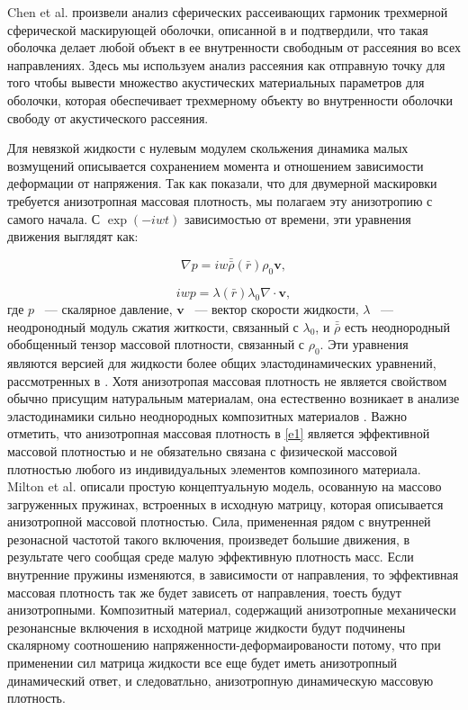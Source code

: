 \documentclass[a4paper, 12pt]{article}
\newcommand{\dbar}[1]{\bar{\bar{#1}}}
\begin{document}
Chen et al. \cite{7} произвели анализ сферических рассеивающих гармоник 
трехмерной сферической маскирующей оболочки, описанной в \cite{1}  
и подтвердили, что такая оболочка делает любой объект в ее внутренности свободным 
от рассеяния во всех направлениях. Здесь мы используем анализ рассеяния как 
отправную точку для того чтобы вывести множество акустических материальных 
параметров для оболочки, которая обеспечивает трехмерному объекту во внутренности
оболочки свободу от акустического рассеяния.

Для невязкой жидкости с нулевым модулем скольжения динамика малых возмущений
описывается сохранением момента и отношением зависимости деформации от 
напряжения. Так как \cite{6} показали, что для двумерной маскировки требуется
анизотропная массовая плотность, мы полагаем эту анизотропию с самого начала.
С $\exp(-iwt)$ зависимостью от времени, эти уравнения движения выглядят как:

\begin{equation}\label{e1}
	\nabla p = iw\dbar{\rho}(\bar{r})\rho_0 \mathbf{v},
\end{equation}

\begin{equation}\label{e2}
	iwp=\lambda(\bar{r})\lambda_0 \nabla \cdot \mathbf{v},
\end{equation}
где $p$ ~--- скалярное давление, $\mathbf{v}$ ~--- вектор скорости жидкости,
$\lambda$ ~--- неодронодный модуль сжатия житкости, связанный с $\lambda_0$,
и $\dbar{\rho}$ есть неоднородный обобщенный тензор массовой плотности, связанный
с $\rho_0$. Эти уравнения являются версией для жидкости более общих
эластодинамических уравнений, рассмотренных в \cite{5}.
Хотя анизотропая массовая плотность не является свойством обычно присущим
натуральным материалам, она естественно возникает в анализе эластодинамики
сильно неоднородных композитных материалов \cite{8}. Важно отметить,
что анизотропная массовая плотность в \eqref{e1} является эффективной
массовой плотностью и не обязательно связана с физической массовой плотностью 
любого из индивидуальных элементов композиного материала. Milton et al. \cite{5}
описали простую концептуальную модель, осованную на массово загруженных
пружинах, встроенных в исходную матрицу, которая описывается анизотропной массовой
плотностью. Сила, примененная рядом с внутренней резонасной частотой такого
включения, произведет большие движения, в результате чего сообщая среде малую 
эффективную плотность масс. Если внутренние пружины изменяются, в зависимости от
направления, то эффективная массовая плотность так же будет зависеть от 
направления, тоесть будут анизотропными. Композитный материал, содержащий
анизотропные механически резонансные включения в исходной матрице жидкости
будут подчинены скалярному соотношению напряженности-деформаированости потому, что 
при применении сил матрица жидкости все еще будет иметь анизотропный динамический 
ответ, и следоватльно, анизотропную динамическую массовую плотность.
\end{document}
